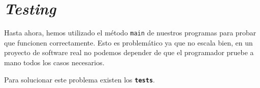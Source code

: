 \section{\textit{Testing}}
  Hasta ahora, hemos utilizado el método \texttt{main} de nuestros programas para probar que 
  funcionen correctamente.
  Esto es problemático ya que no escala bien, en un proyecto de software real no podemos depender
  de que el programador pruebe a mano todos los casos necesarios.

  Para solucionar este problema existen los \textbf{\texttt{tests}}.
  

